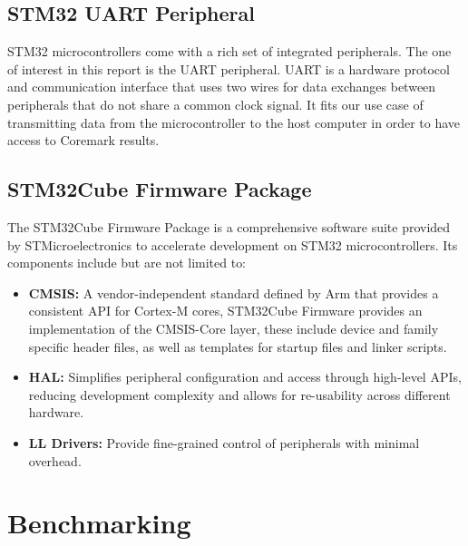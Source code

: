 \subsection{STM32 UART Peripheral}
STM32 microcontrollers come with a rich set of integrated peripherals. The one of interest in this report is the UART peripheral.
UART is a hardware protocol and communication interface that uses two wires for data exchanges between peripherals that do not share a common clock signal. It fits our use case of transmitting data from the microcontroller to the host computer in order to have access to Coremark results.
\newpage
\subsection{STM32Cube Firmware Package}
The STM32Cube Firmware Package is a comprehensive software suite provided by STMicroelectronics to accelerate development on STM32 microcontrollers. Its components include but are not limited to:
\begin{itemize}
    \item \textbf{CMSIS:} A vendor-independent standard defined by Arm that provides a consistent API for Cortex-M cores, STM32Cube Firmware provides an implementation of the CMSIS-Core layer, these include device and family specific header files, as well as templates for startup files and linker scripts.
    \item \textbf{HAL:} Simplifies peripheral configuration and access through high-level APIs, reducing development complexity and allows for re-usability across different hardware.
    \item \textbf{LL Drivers:} Provide fine-grained control of peripherals with minimal overhead.
\end{itemize}


\section{Benchmarking}
